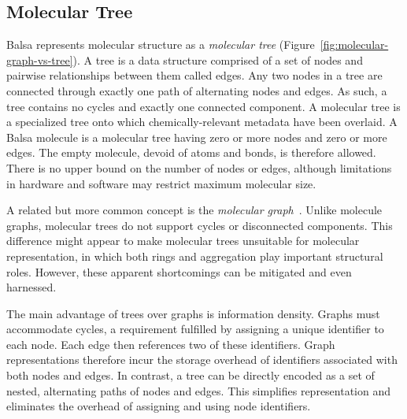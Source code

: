 \documentclass{article}
\begin{document}
\subsection*{Molecular Tree}
\label{molecular-tree}

Balsa represents molecular structure as a \textit{molecular tree} (Figure~\ref{fig:molecular-graph-vs-tree}). A tree is a data structure comprised of a set of nodes and pairwise relationships between them called edges. Any two nodes in a tree are connected through exactly one path of alternating nodes and edges. As such, a tree contains no cycles and exactly one connected component. A molecular tree is a specialized tree onto which chemically-relevant metadata have been overlaid. A Balsa molecule is a molecular tree having zero or more nodes and zero or more edges. The empty molecule, devoid of atoms and bonds, is therefore allowed. There is no upper bound on the number of nodes or edges, although limitations in hardware and software may restrict maximum molecular size.

A related but more common concept is the \textit{molecular graph}~\cite{balaban:1985}. Unlike molecule graphs, molecular trees do not support cycles or disconnected components. This difference might appear to make molecular trees unsuitable for molecular representation, in which both rings and aggregation play important structural roles. However, these apparent shortcomings can be mitigated and even harnessed.

The main advantage of trees over graphs is information density. Graphs must accommodate cycles, a requirement fulfilled by assigning a unique identifier to each node. Each edge then references two of these identifiers. Graph representations therefore incur the storage overhead of identifiers associated with both nodes and edges. In contrast, a tree can be directly encoded as a set of nested, alternating paths of nodes and edges. This simplifies representation and eliminates the overhead of assigning and using node identifiers. 
\end{document}
